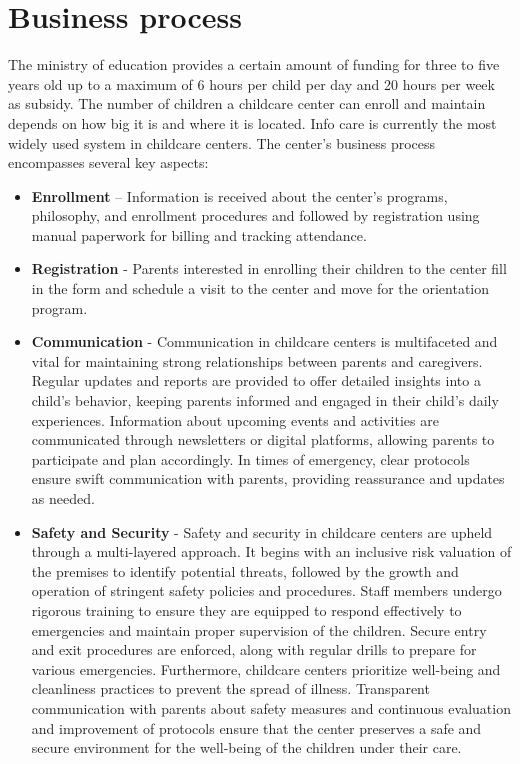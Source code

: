 \section{Business process}
The ministry of education provides a certain amount of funding for three to five years old up to a maximum of 6 hours per child per day and 20 hours per week as subsidy. The number of children a childcare center can enroll and maintain depends on how big it is and where it is located. Info care is currently the most widely used system in childcare centers. The center’s business process encompasses several key aspects: 

\begin{itemize}
    \item \textbf{Enrollment} – Information is received about the center’s programs, philosophy, and enrollment procedures and followed by registration using manual paperwork for billing and tracking attendance.
    \item \textbf{Registration} - Parents interested in enrolling their children to the center fill in the form and schedule a visit to the center and move for the orientation program. 
    \item \textbf{Communication} - Communication in childcare centers is multifaceted and vital for maintaining strong relationships between parents and caregivers. Regular updates and reports are provided to offer detailed insights into a child's behavior, keeping parents informed and engaged in their child's daily experiences. Information about upcoming events and activities are communicated through newsletters or digital platforms, allowing parents to participate and plan accordingly. In times of emergency, clear protocols ensure swift communication with parents, providing reassurance and updates as needed. \cite{mitchell2006teachers}
    \item \textbf{Safety and Security} - Safety and security in childcare centers are upheld through a multi-layered approach. It begins with an inclusive risk valuation of the premises to identify potential threats, followed by the growth and operation of stringent safety policies and procedures. Staff members undergo rigorous training to ensure they are equipped to respond effectively to emergencies and maintain proper supervision of the children. Secure entry and exit procedures are enforced, along with regular drills to prepare for various emergencies. Furthermore, childcare centers prioritize well-being and cleanliness practices to prevent the spread of illness. Transparent communication with parents about safety measures and continuous evaluation and improvement of protocols ensure that the center preserves a safe and secure environment for the well-being of the children under their care.  

\end{itemize}
